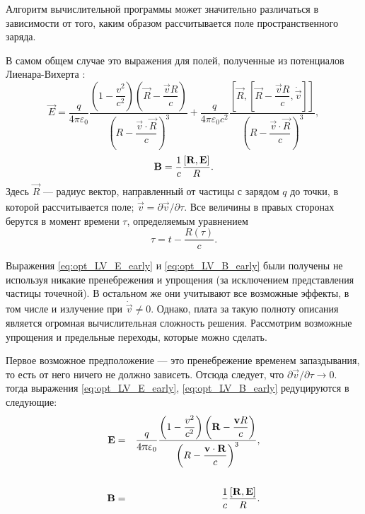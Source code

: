Алгоритм вычислительной программы может значительно различаться в зависимости от того, каким образом рассчитывается поле пространственного заряда. 

В самом общем случае это выражения для полей, полученные из потенциалов Лиенара-Вихерта \cite{Landau2}:
\begin{equation}
	\vec{E} = \dfrac{q}{4 \pi \varepsilon_0} \dfrac{\left( 1 - \dfrac{v^2}{c^2} \right) \left( \vec{R} - \dfrac{\vec{v} R}{c}  \right) }{\left( R - \dfrac{\vec{v} \cdot \vec{ R}}{c} \right)^3} + \dfrac{q}{4 \pi \varepsilon_0 c^2} \dfrac{\left[ \vec{R} , \left[ \vec{R} - \dfrac{\vec{v}R}{c} , \dot{\vec{v}}  \right]  \right]}{\left( R - \dfrac{\vec{v} \cdot \vec{ R}}{c} \right)^3},
	\label{eq:opt_LV_E_early}
\end{equation}
\begin{equation}
	\mathbf{B} = \frac{1}{c} \frac{\left[ \mathbf{{R}},\mathbf{{E}} \right]}{R}.
	\label{eq:opt_LV_B_early}
\end{equation}
Здесь $\vec{R}$ --- радиус вектор, направленный от частицы с зарядом $q$ до точки, в которой рассчитывается поле;  $\dot{\vec{v}} = \partial \vec{v} / \partial \tau$. Все величины в правых сторонах берутся в момент времени $\tau$, определяемым уравнением 
\begin{equation}
	\tau = t - \frac{R(\tau)}{c}.
	\label{eq:wait_for_me}
\end{equation}


Выражения \eqref{eq:opt_LV_E_early} и \eqref{eq:opt_LV_B_early} были получены не используя никакие пренебрежения и упрощения (за исключением представления частицы точечной). В остальном же они учитывают все возможные эффекты, в том числе и излучение при $\dot{\vec{v}} \neq 0$. Однако, плата за такую полноту описания является огромная вычислительная сложность решения. Рассмотрим возможные упрощения и предельные переходы, которые можно сделать.

Первое возможное предположение --- это пренебрежение временем запаздывания, то есть от него ничего не должно зависеть. Отсюда следует, что $\partial \vec{v}/\partial \tau \to 0$.
тогда выражения \eqref{eq:opt_LV_E_early}, \eqref{eq:opt_LV_B_early} редуцируются в следующие:
\begin{eqnarray}
	\mathbf{E} &=& \dfrac{q}{4 \uppi \upvarepsilon_0} \dfrac{\left( 1 - \dfrac{v^2}{c^2} \right) \left( \mathbf{R} - \dfrac{\mathbf{v} R}{c}  \right) }{\left( R - \dfrac{\mathbf{v} \cdot \mathbf{ R}}{c} \right)^3} , \\ \nonumber \\
	\label{eq:opt_LV_E_easy}
	\mathbf{B} &=& \dfrac{1}{c} \frac{\left[ \mathbf{{R}},\mathbf{{E}} \right]}{R}.
	\label{eq:opt_LV_B_easy}
\end{eqnarray}

